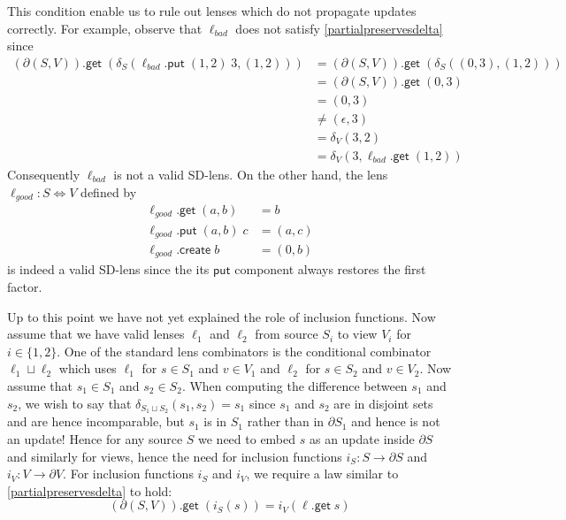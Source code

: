 \documentclass[acmsmall,review,anonymous]{acmart}\settopmatter{printfolios=true,printccs=false,printacmref=false}
\newcommand{\kw}[1]{\ensuremath{\mathsf{#1}}\xspace}
\newcommand{\get}{\ensuremath{\kw{get}}\xspace}
\newcommand{\pput}{\ensuremath{\kw{put}}\xspace}
\newcommand{\create}{\ensuremath{\kw{create}}\xspace}
\begin{document}
This condition enable us to rule out lenses which do not propagate updates
correctly. For example, observe that $\ell_{bad}$ does not satisfy
\cref{partialpreservesdelta} since
\begin{align*}
(\partial (S, V)).\get \; (\delta_S(\ell_{bad}.\pput \; (1,2) \; 3, (1,2))) &=
(\partial (S, V)).\get \; (\delta_S((0,3), (1,2)))\\
&= (\partial (S, V)).\get \; (0,3)\\
&= (0,3)\\
&\neq (\epsilon, 3)\\
&= \delta_V(3, 2)\\
&= \delta_V(3, \ell_{bad}.\get \; (1, 2))
\end{align*}
Consequently $\ell_{bad}$ is not a valid SD-lens. On the
other hand, the lens $\ell_{good} : S \Leftrightarrow V$ defined by
\begin{align*}
\ell_{good}.\get \; (a, b) &= b\\
\ell_{good}.\pput \; (a, b) \; c &= (a, c)\\
\ell_{good}.\create \; b &= (0, b)
\end{align*}
is indeed a valid SD-lens since the its \pput component always restores the
first factor.

Up to this point we have not yet explained the role of inclusion functions. Now
assume that we have valid lenses $\ell_1$ and $\ell_2$ from source $S_i$ to
view $V_i$ for $i \in  \{1, 2\}$. One of the standard lens combinators is the
conditional combinator $\ell_1 \sqcup \ell_2$ which uses $\ell_1$ for $s \in
S_1$ and $v \in V_1$ and $\ell_2$ for $s \in S_2$ and $v \in V_2$. Now assume
that $s_1 \in S_1$ and $s_2 \in S_2$. When computing the difference between
$s_1$ and $s_2$, we wish to say that $\delta_{S_1 \sqcup S_2}(s_1, s_2) = s_1$
since $s_1$ and $s_2$ are in disjoint sets and are hence incomparable, but $s_1$
is in $S_1$ rather than in $\partial S_1$ and hence is not an update! Hence for
any source $S$ we need to embed $s$ as an update inside $\partial S$ and
similarly for views, hence the need for inclusion functions $i_S : S
\longrightarrow \partial S$ and $i_V : V \longrightarrow \partial V$. For
inclusion functions $i_S$ and $i_V$, we require a law similar to
\cref{partialpreservesdelta} to hold: $$(\partial (S, V)).\get \; (i_{S}(s)) =
i_{V}(\ell.\get \; s)$$
\end{document}
